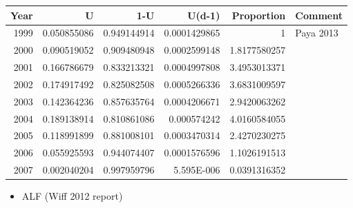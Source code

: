 \documentclass[11pt]{article}
\begin{document}
\begin{center}
\begin{tabular}{rrrrrl}
 Year  &            U  &          1-U  &        U(d-1)  &    Proportion  &  Comment    \\
\hline
 1999  &  0.050855086  &  0.949144914  &  0.0001429865  &             1  &  Paya 2013  \\
 2000  &  0.090519052  &  0.909480948  &  0.0002599148  &  1.8177580257  &             \\
 2001  &  0.166786679  &  0.833213321  &  0.0004997808  &  3.4953013371  &             \\
 2002  &  0.174917492  &  0.825082508  &  0.0005266336  &  3.6831009597  &             \\
 2003  &  0.142364236  &  0.857635764  &  0.0004206671  &  2.9420063262  &             \\
 2004  &  0.189138914  &  0.810861086  &   0.000574242  &  4.0160584055  &             \\
 2005  &  0.118991899  &  0.881008101  &  0.0003470314  &  2.4270230275  &             \\
 2006  &  0.055925593  &  0.944074407  &  0.0001576596  &  1.1026191513  &             \\
 2007  &  0.002040204  &  0.997959796  &    5.595E-006  &  0.0391316352  &             \\
\end{tabular}
\end{center}




\begin{itemize}
\item ALF (Wiff 2012 report)
\end{itemize}
\end{document}
